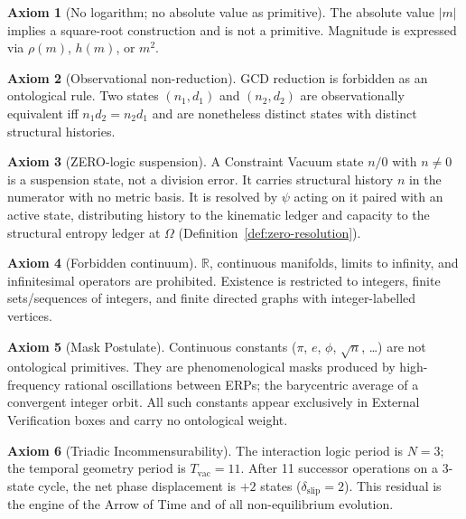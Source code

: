 \documentclass[11pt, letterpaper]{article}
\newcommand{\rank}{\rho}
\newcommand{\hfn}{h}
\theoremstyle{definition}
\newtheorem{axiom}{Axiom}[section]
\theoremstyle{plain}
\begin{document}
\begin{axiom}[No logarithm; no absolute value as primitive]\label{ax:no-log}
The absolute value $|m|$ implies a square-root construction and is not a
primitive.  Magnitude is expressed via $\rank(m)$, $\hfn(m)$, or $m^2$.
\end{axiom}

\begin{axiom}[Observational non-reduction]\label{ax:non-reduction}
GCD reduction is forbidden as an ontological rule.  Two states $(n_1,d_1)$
and $(n_2,d_2)$ are observationally equivalent iff $n_1 d_2=n_2 d_1$ and
are nonetheless distinct states with distinct structural histories.
\end{axiom}

\begin{axiom}[ZERO-logic suspension]\label{ax:zero-logic}
A Constraint Vacuum state $n/0$ with $n\neq 0$ is a suspension state, not
a division error.  It carries structural history $n$ in the numerator with
no metric basis.  It is resolved by $\psi$ acting on it paired with an
active state, distributing history to the kinematic ledger and capacity
to the structural entropy ledger at $\Omega$ (Definition~\ref{def:zero-resolution}).
\end{axiom}

\begin{axiom}[Forbidden continuum]\label{ax:forbidden-continuum}
$\mathbb{R}$, continuous manifolds, limits to infinity, and infinitesimal
operators are prohibited.  Existence is restricted to integers, finite
sets/sequences of integers, and finite directed graphs with integer-labelled
vertices.
\end{axiom}

\begin{axiom}[Mask Postulate]\label{ax:mask}
Continuous constants ($\pi$, $e$, $\phi$, $\sqrt{n}$, \ldots) are not
ontological primitives.  They are phenomenological masks produced by
high-frequency rational oscillations between ERPs; the barycentric average of
a convergent integer orbit.  All such constants appear exclusively in
External Verification boxes and carry no ontological weight.
\end{axiom}

\begin{axiom}[Triadic Incommensurability]\label{ax:triadic}
The interaction logic period is $N=3$; the temporal geometry period is
$T_{\mathrm{vac}}=11$.  After 11 successor operations on a 3-state cycle,
the net phase displacement is $+2$ states ($\delta_{\mathrm{slip}}=2$).
This residual is the engine of the Arrow of Time and of all non-equilibrium
evolution.
\end{axiom}
\end{document}
